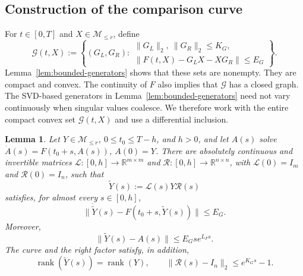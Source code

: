 \documentclass[]{article}
\numberwithin{equation}{section}
\theoremstyle{plain}
\newtheorem{lemma}[theorem]{Lemma}
\theoremstyle{remark}
\numberwithin{algorithm}{section}
\newcommand{\R}{\mathbb{R}}
\newcommand{\Mle}{\mathcal{M}_{\le r}}
\newcommand{\rank}{\operatorname{rank}}
\begin{document}
\subsection{Construction of the comparison curve}
\label{app:generator-flow}

For \(t\in[0,T]\) and \(X\in\Mle\), define
\begin{equation}\label{eq:generator-multifunction}
 \mathcal G(t,X):=
 \left\{(G_L,G_R):
 \begin{array}{l}
  \|G_L\|_2,\ \|G_R\|_2\le K_G,\\
  \|F(t,X)-G_LX-XG_R\|\le E_G
 \end{array}
 \right\}.
\end{equation}
Lemma~\ref{lem:bounded-generators} shows that these sets are nonempty.
They are compact and convex.  The continuity of \(F\) also implies that \(\mathcal G\) has a
closed graph.
The SVD-based generators in Lemma~\ref{lem:bounded-generators} need not vary
continuously when singular values coalesce.  We therefore work with the
entire compact convex set \(\mathcal G(t,X)\) and use a differential
inclusion.

\begin{lemma}
\label{lem:generator-flow}
Let \(Y\in\Mle\), \(0\le t_0\le T-h\), and \(h>0\), and let \(A(s)\)
solve \(\dot A(s)=F(t_0+s,A(s))\), \(A(0)=Y\).  There are
absolutely continuous and invertible matrices
\(\mathcal L:[0,h]\to\R^{m\times m}\) and
\(\mathcal R:[0,h]\to\R^{n\times n}\), with
\(\mathcal L(0)=I_m\) and \(\mathcal R(0)=I_n\), such that
\begin{equation}\label{eq:comparison-curve-defined}
 \widetilde Y(s):=\mathcal L(s)Y\mathcal R(s)
\end{equation}
satisfies, for almost every \(s\in[0,h]\),
\begin{equation}\label{eq:generator-flow-residual}
 \|\dot{\widetilde Y}(s)
       -F(t_0+s,\widetilde Y(s))\|\le E_G.
\end{equation}
Moreover,
\begin{equation}\label{eq:generator-flow-distance}
 \|\widetilde Y(s)-A(s)\|
 \le E_Gs e^{L_Fs}.
\end{equation}
The curve and the right factor satisfy, in addition,
\begin{equation}\label{eq:generator-flow-right-factor}
 \rank(\widetilde Y(s))=\rank(Y),
 \qquad
 \|\mathcal R(s)-I_n\|_2\le e^{K_Gs}-1.
\end{equation}
\end{lemma}
\end{document}
